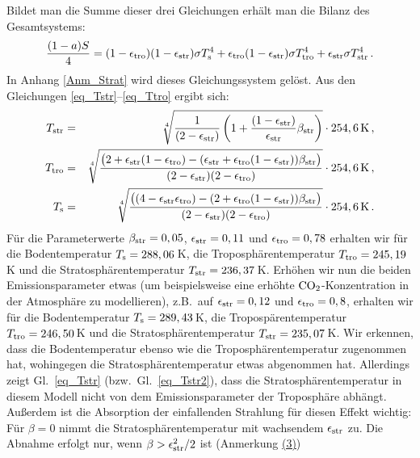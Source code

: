 Bildet man die Summe dieser drei Gleichungen erh\"alt man die Bilanz des Gesamtsystems:
\begin{equation}
   \frac{(1-a)S}{4} = (1-\epsilon_{\rm tro})(1- \epsilon_{\rm str}) \sigma T_{\rm s}^4 +
     \epsilon_{\rm tro} (1 - \epsilon_{\rm str}) \sigma T_{\rm tro}^4 +\epsilon_{\rm str} \sigma T_{\rm str}^4 \, .
\end{equation}
In Anhang \ref{Anm_Strat} wird dieses Gleichungssystem gel\"ost. Aus den Gleichungen 
\ref{eq_Tstr}--\ref{eq_Ttro} ergibt sich:
\begin{eqnarray}
\label{eq_Tstr2}
    T_{\rm str}  &=&   \sqrt[4]{ \frac{1}{(2-\epsilon_{\rm str})} 
   \left( 1 + \frac{(1-\epsilon_{\rm str})}{\epsilon_{\rm str}} \beta_{\rm str} \right)}  
           \cdot   254,6\,{\rm K}          \, ,  \\        
    T_{\rm tro}  &=&   \sqrt[4]{   
   \frac{   \big( 2+ \epsilon_{\rm str}(1-\epsilon_{\rm tro})  -  ( \epsilon_{\rm str}+ 
          \epsilon_{\rm tro} (1-\epsilon_{\rm str})) \beta_{\rm str} \big)  }{(2-\epsilon_{\rm str})(2-\epsilon_{\rm tro})}} 
          \cdot    254,6\,{\rm K}          \, ,  \\        
    T_{\rm s}  &=&     \sqrt[4]{
   \frac{\big( (4-\epsilon_{\rm str} \epsilon_{\rm tro})
    -  (2+ \epsilon_{\rm tro} (1-\epsilon_{\rm str})) \beta_{\rm str} \big)}{(2-\epsilon_{\rm str})(2-\epsilon_{\rm tro})} }
          \cdot    254,6\,{\rm K}         \, .        
\end{eqnarray}
F\"ur die Parameterwerte $\beta_{\rm str}=0,05$, $\epsilon_{\rm str}=0,11$ und
$\epsilon_{\rm tro}=0,78$ erhalten wir f\"ur die Bodentemperatur $T_{\rm s}= 288,06$\,K, die 
Troposph\"arentemperatur $T_{\rm tro}= 245,19$\,K und die Stratosph\"arentemperatur 
$T_{\rm str}=236,37$\,K. Erh\"ohen wir nun die beiden Emissionsparameter etwas (um beispielsweise
eine erh\"ohte ${\rm CO}_2$-Konzentration in der Atmosph\"are zu modellieren), z.B.\ auf
$\epsilon_{\rm str}=0,12$ und $\epsilon_{\rm tro}=0,8$, erhalten wir f\"ur die Bodentemperatur
$T_{\rm s}= 289,43$\,K, die Troposp\"arentemperatur $T_{\rm tro}= 246,50$\,K und die
Stratosph\"arentemperatur $T_{\rm str}= 235,07$\,K. Wir erkennen, dass die Bodentemperatur
ebenso wie die Troposph\"arentemperatur zugenommen hat, wohingegen die Stratosph\"arentemperatur
etwas abgenommen hat. Allerdings zeigt Gl.\ \ref{eq_Tstr} (bzw.\ Gl.\ \ref{eq_Tstr2}), dass die
Stratosph\"arentemperatur in diesem Modell nicht von dem Emissionsparameter der Troposph\"are
abh\"angt. Au\ss erdem ist die Absorption der einfallenden Strahlung f\"ur diesen Effekt wichtig:
F\"ur $\beta=0$ nimmt die Stratosph\"arentemperatur mit wachsendem $\epsilon_{\rm str}$ zu. 
Die Abnahme erfolgt nur, wenn $\beta > \epsilon_{\rm str}^2/2$ ist (Anmerkung \hyperref[Anm-3]{(3)})




